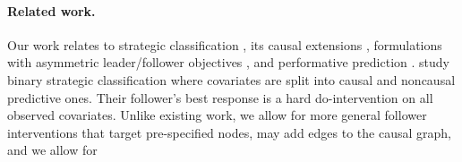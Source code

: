 \paragraph{Related work.}
Our work relates to strategic
classification \citep{hardtStrategicClassification2016, brucknerStackelbergGamesAdversarial2011},
its causal extensions \citep{miller2020strategic, shavitCausalStrategicLinear2022},   
formulations with asymmetric leader/follower
objectives \citep{ehrenbergAdversariesIncentivesStrategic2024}, and
performative prediction \citep{perdomo2020performative}.
\citet{horowitzCausalStrategicClassification2023}
study binary strategic classification where covariates are
split into
causal and
noncausal predictive ones.
Their follower's best response is a hard do-intervention on all observed covariates.
%
%
Unlike existing work, we allow 
for more general follower
interventions that target pre-specified nodes, may add edges to the causal graph, and we allow for
